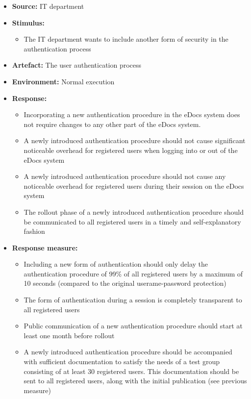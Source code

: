 \documentclass[a4paper,10pt]{article}
\begin{document}
\begin{itemize}
    \item \textbf{Source:} IT department
    \item \textbf{Stimulus:}
        \begin{itemize}
            \item The IT department wants to include another form of security in the authentication process
        \end{itemize}

    \item \textbf{Artefact:} The user authentication process
    \item \textbf{Environment:} Normal execution
    \item \textbf{Response:}
        \begin{itemize}
            \item Incorporating a new authentication procedure in the eDocs system does not require changes to any other part of the eDocs system.
            \item A newly introduced authentication procedure should not cause significant noticeable overhead for registered users when logging into or out of the eDocs system
            \item A newly introduced authentication procedure should not cause any noticeable overhead for registered users during their session on the eDocs system
            \item The rollout phase of a newly introduced authentication procedure should be communicated to all registered users in a timely and self-explanatory fashion
        \end{itemize}

    \item \textbf{Response measure:}
        \begin{itemize}
            \item Including a new form of authentication should only delay the authentication procedure of 99\% of all registered users by a maximum of 10 seconds (compared to the original userame-password protection)
            \item The form of authentication during a session is completely transparent to all registered users
            \item Public communication of a new authentication procedure should start at least one month before rollout
            \item A newly introduced authentication procedure should be accompanied with sufficient documentation to satisfy the needs of a test group consisting of at least 30 registered users. This documentation should be sent to all registered users, along with the initial publication (see previous measure)
        \end{itemize}
\end{itemize}
\end{document}
